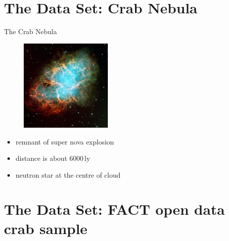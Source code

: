 \section{The Data Set: Crab Nebula}

\begin{frame}[t]{The Crab Nebula}
  \begin{multicols}{2}
    \begin{figure}
        \centering
        \includegraphics[width=0.4\textwidth]{fig/crab.jpg}
    \end{figure}
    \columnbreak
    \vspace*{\fill}
    \begin{itemize}
        \item remnant of super nova explosion
        \item distance is about $6000\,\text{ly}$
        \item neutron star at the centre of cloud
    \end{itemize}
    \vspace*{\fill}
  \end{multicols}
\end{frame}

\section{The Data Set: FACT open data crab sample}

